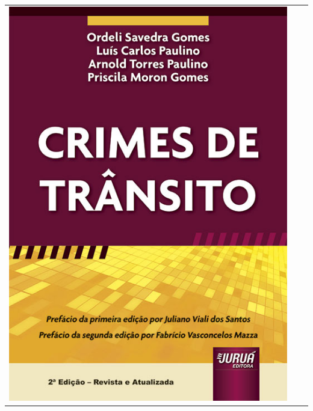 \documentclass[
  letterpaper,
  DIV=11,
  numbers=noendperiod]{scrreport}
\begin{document}
\begin{longtable}[]{@{}
  >{\centering\arraybackslash}p{}
  >{\centering\arraybackslash}p{}
  >{\centering\arraybackslash}p{}@{}}
\toprule()
\endhead
\includegraphics{./images/crime1-01.jpg} &

\end{longtable}
\end{document}
